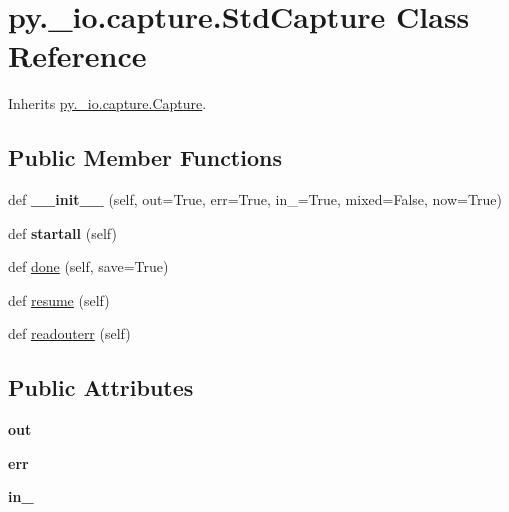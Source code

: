 \hypertarget{classpy_1_1__io_1_1capture_1_1_std_capture}{}\section{py.\+\_\+io.\+capture.\+Std\+Capture Class Reference}
\label{classpy_1_1__io_1_1capture_1_1_std_capture}


Inherits \hyperlink{classpy_1_1__io_1_1capture_1_1_capture}{py.\+\_\+io.\+capture.\+Capture}.

\subsection*{Public Member Functions}
\begin{DoxyCompactItemize}
\item 
\mbox{\label{classpy_1_1__io_1_1capture_1_1_std_capture_adcd7512f0d4b8fff96e724144b8e1c98}} 
def {\bfseries \+\_\+\+\_\+init\+\_\+\+\_\+} (self, out=True, err=True, in\+\_\+=True, mixed=False, now=True)
\item 
\mbox{\label{classpy_1_1__io_1_1capture_1_1_std_capture_aacc51e90735755ab25325181d8c2144b}} 
def {\bfseries startall} (self)
\item 
def \hyperlink{classpy_1_1__io_1_1capture_1_1_std_capture_a9d142cac1dcf577a7c819e4ebcb30fb7}{done} (self, save=True)
\item 
def \hyperlink{classpy_1_1__io_1_1capture_1_1_std_capture_a06868768c8650fe4dbbf8838e3eeab73}{resume} (self)
\item 
def \hyperlink{classpy_1_1__io_1_1capture_1_1_std_capture_ae843e689868aff7d502b9328b040bf9d}{readouterr} (self)
\end{DoxyCompactItemize}
\subsection*{Public Attributes}
\begin{DoxyCompactItemize}
\item 
\mbox{\label{classpy_1_1__io_1_1capture_1_1_std_capture_a38af17100f4335835466bb5dc62ac124}} 
{\bfseries out}
\item 
\mbox{\label{classpy_1_1__io_1_1capture_1_1_std_capture_a3643ee8acbb087478ca3436e897dd73a}} 
{\bfseries err}
\item 
\mbox{\label{classpy_1_1__io_1_1capture_1_1_std_capture_aba6ae2bc06d9bc462c6005ad390027a1}} 
{\bfseries in\+\_\+}
\end{DoxyCompactItemize}
